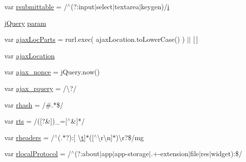 \begin{DoxyCompactItemize}
\item 
var \hyperlink{obj_2_release_2_package_2_package_tmp_2_scripts_2jquery-1_810_82_8js_a12d248d7e6c5985c5ea21f56fbef9e90}{rsubmittable} = /$^\wedge$(?\+:input$\vert$select$\vert$textarea$\vert$keygen)/\hyperlink{_scripts_2respond_8min_8js_a5e25b1d1bed9ab5f3174b76d6a722180}{i}
\item 
\hyperlink{_scripts_2jquery-1_810_82_8js_a41c2e1bff4a6b292938143764e31d789}{j\+Query} \hyperlink{obj_2_release_2_package_2_package_tmp_2_scripts_2jquery-1_810_82_8js_a24ced9cd3c9e1970a8cbe8d7adedc765}{param}
\item 
var \hyperlink{obj_2_release_2_package_2_package_tmp_2_scripts_2jquery-1_810_82_8js_a4c35110da3c335cfca38505ee65a5e79}{ajax\+Loc\+Parts} = rurl.\+exec( ajax\+Location.\+to\+Lower\+Case() ) $\vert$$\vert$ \mbox{[}$\,$\mbox{]}
\item 
var \hyperlink{obj_2_release_2_package_2_package_tmp_2_scripts_2jquery-1_810_82_8js_a1661d4e1676e7c6ffde5a3cb8d8ae246}{ajax\+Location}
\item 
var \hyperlink{obj_2_release_2_package_2_package_tmp_2_scripts_2jquery-1_810_82_8js_aaa43e6d4c76ee8be878dd7e93fb755a4}{ajax\+\_\+nonce} = j\+Query.\+now()
\item 
var \hyperlink{obj_2_release_2_package_2_package_tmp_2_scripts_2jquery-1_810_82_8js_a4da85c0011217bf1643139dc23999c5c}{ajax\+\_\+rquery} = /\textbackslash{}?/
\item 
var \hyperlink{obj_2_release_2_package_2_package_tmp_2_scripts_2jquery-1_810_82_8js_a6990b6955b6bec9dd39f3814cfb56d6d}{rhash} = /\#.$\ast$\$/
\item 
var \hyperlink{obj_2_release_2_package_2_package_tmp_2_scripts_2jquery-1_810_82_8js_a38ff30904f54277281a13514d7aea00d}{rts} = /(\mbox{[}?\&\mbox{]})\+\_\+=\mbox{[}$^\wedge$\&\mbox{]}$\ast$/
\item 
var \hyperlink{obj_2_release_2_package_2_package_tmp_2_scripts_2jquery-1_810_82_8js_af506d11612139f03091db71089d92e8b}{rheaders} = /$^\wedge$(.$\ast$?)\+:\mbox{[} \textbackslash{}\hyperlink{_scripts_2jquery_8validate_8min_8js_a23c5666e83bbbceee94adcd0851f50c4}{t}\mbox{]}$\ast$(\mbox{[}$^\wedge$\textbackslash{}r\textbackslash{}n\mbox{]}$\ast$)\textbackslash{}r?\$/mg
\item 
var \hyperlink{obj_2_release_2_package_2_package_tmp_2_scripts_2jquery-1_810_82_8js_af4dd13c90298bbf53ce08ec707dc9e2a}{rlocal\+Protocol} = /$^\wedge$(?\+:about$\vert$app$\vert$app-\/storage$\vert$.+-\/extension$\vert$file$\vert$res$\vert$widget)\+:\$/
\item 
$$
\end{DoxyCompactItemize}
